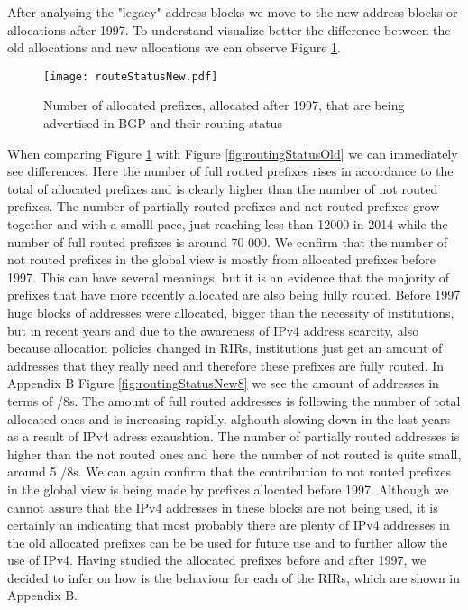 \documentclass[11pt,a4paper]{scrreprt}
\begin{document}
After analysing the "legacy" address blocks we move to the new address blocks or allocations after 1997. To understand visualize better the difference between the old allocations and new allocations we can observe Figure \ref{fig:routingStatusNew}.

\begin{figure}[!h]
\centering
\texttt{[image: routeStatusNew.pdf]}
\caption{Number of allocated prefixes, allocated after 1997, that are being advertised in BGP and their routing status}
\label{fig:routingStatusNew}
\end{figure}

When comparing Figure \ref{fig:routingStatusNew} with Figure \ref{fig:routingStatusOld} we can immediately see differences. Here the number of full routed prefixes rises in accordance to the total of allocated prefixes and is clearly higher than the number of not routed prefixes. The number of partially routed prefixes and not routed prefixes grow together and with a smalll pace, just reaching less than 12000 in 2014 while the number of full routed prefixes is around 70 000. We confirm that the number of not routed prefixes in the global view is mostly from allocated prefixes before 1997. This can have several meanings, but it is an evidence that the majority of prefixes that have more recently allocated are also being fully routed. Before 1997 huge blocks of addresses were allocated, bigger than the necessity of institutions, but in recent years and due to the awareness of IPv4 address scarcity, also because allocation policies changed in RIRs, institutions just get an amount of addresses that they really need and therefore these prefixes are fully routed. 
In Appendix B Figure \ref{fig:routingStatusNew8} we see the amount of addresses in terms of /8s. The amount of full routed addresses is following the number of total allocated ones and is increasing rapidly, alghouth slowing down in the last years as a result of IPv4 adress exaushtion. The number of partially routed addresses is higher than the not routed ones and here the number of not routed is quite small, around 5 /8s. We can again confirm that the contribution to not routed prefixes in the global view is being made by prefixes allocated before 1997. Although we cannot assure that the IPv4 addresses in these blocks are not being used, it is certainly an indicating that most probably there are plenty of IPv4 addresses in the old allocated prefixes can be be used for future use and to further allow the use of IPv4.
Having studied the allocated prefixes before and after 1997, we decided to infer on how is the behaviour for each of the RIRs, which are shown in Appendix B. 
\end{document}
